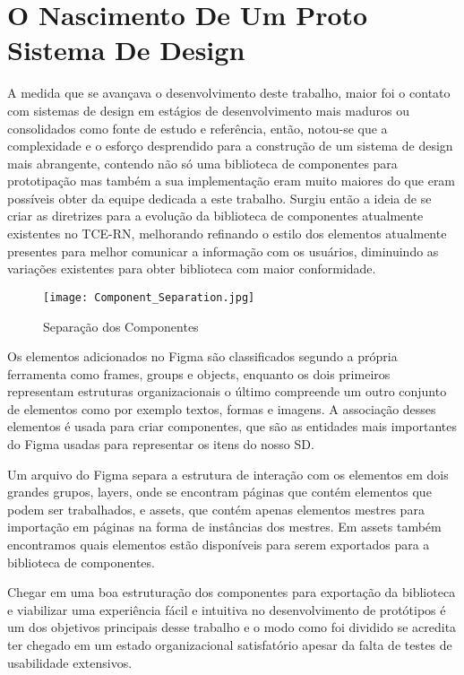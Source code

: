 \section{O Nascimento De Um Proto Sistema De Design} \label{secao34}

  A medida que se avançava o desenvolvimento deste trabalho, maior foi o contato com sistemas de design em estágios de desenvolvimento mais maduros ou consolidados como fonte de estudo e referência, então, notou-se que a complexidade e o esforço desprendido para a construção de um sistema de design mais abrangente, contendo não só uma biblioteca de componentes para prototipação mas também a sua implementação eram muito maiores do que eram possíveis obter da equipe dedicada a este trabalho. Surgiu então a ideia de se criar as diretrizes para a evolução da biblioteca de componentes atualmente existentes no TCE-RN, melhorando refinando o estilo dos elementos atualmente presentes para melhor comunicar a informação com os usuários, diminuindo as variações existentes para obter biblioteca com maior conformidade.

  
  \begin{wrapfigure}{l}{0.5\textwidth}
    \texttt{[image: Component\_Separation.jpg]} 
    \caption{Separação dos Componentes }
    \label{fig:wrapfig}
  \end{wrapfigure}
  
  Os elementos adicionados no Figma são classificados segundo a própria ferramenta como frames, groups e objects, enquanto os dois primeiros representam estruturas organizacionais o último compreende um outro conjunto de elementos como por exemplo textos, formas e imagens. A associação desses elementos é usada para criar componentes, que são as entidades mais importantes do Figma usadas para representar os itens do nosso SD.

  Um arquivo do Figma separa a estrutura de interação com os elementos em dois grandes grupos, layers, onde se encontram páginas que contém elementos que podem ser trabalhados, e assets, que contém apenas elementos mestres para importação em páginas na forma de instâncias dos mestres. Em assets também encontramos quais elementos estão disponíveis para serem exportados para a biblioteca de componentes.

  Chegar em uma boa estruturação dos componentes para exportação da biblioteca e viabilizar uma experiência fácil e intuitiva no desenvolvimento de protótipos é um dos objetivos principais desse trabalho e o modo como foi dividido se acredita ter chegado em um estado organizacional satisfatório apesar da falta de testes de usabilidade extensivos.

